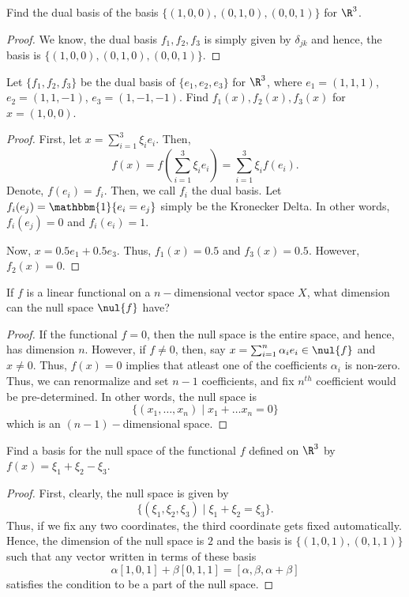 \begin{question}
    Find the dual basis of the basis $\{(1,0,0) , (0,1,0) , (0,0,1)\}$ for $\R^3$.
    \label{section2.9-3}
\end{question}
\begin{proof}
    We know, the dual basis $f_1,f_2,f_3$ is simply given by $\delta_{jk}$ and hence, the basis is $\{(1,0,0) , (0,1,0) , (0,0,1)\}$.
\end{proof}

\begin{question}
    Let $\{f_1 , f_2 , f_3\}$ be the dual basis of $\{e_1 , e_2 , e_3\}$ for $\R^3$, where $e_1 = (1,1,1)$, $e_2 = (1,1,-1)$, $e_3 = (1,-1,-1)$. Find $f_1(x) , f_2(x) , f_3(x)$ for $x = (1,0,0)$.
    \label{section2.9-4}
\end{question}
\begin{proof}
    First, let $x = \sum_{i=1}^3 \xi_i e_i$. Then, 
    \[f(x) = f\left(\sum_{i=1}^3 \xi_i e_i\right) = \sum_{i=1}^3 \xi_i f(e_i).\]
    Denote, $f(e_i) = f_i$. Then, we call $f_i$ the dual basis. Let $f_i(e_j) = \mathbbm{1}\{e_i = e_j\}$ simply be the Kronecker Delta. In other words, $f_i(e_j) = 0$ and $f_i(e_i) = 1$.
    
    Now, $x = 0.5 e_1 + 0.5 e_3$. Thus, $f_1(x) = 0.5 $ and $f_3(x) = 0.5$. However, $f_2(x) = 0$.
\end{proof}

\begin{question}
    If $f$ is a linear functional on a $n-$dimensional vector space $X$, what dimension can the null space $\nul{f}$ have?
    \label{section2.9-5}
\end{question}
\begin{proof}
    If the functional $f = 0$, then the null space is the entire space, and hence, has dimension $n$. However, if $f \neq 0$, then, say $x = \sum_{i=1}^n \alpha_i e_i \in \nul{f}$ and $x \neq 0$. Thus, $f(x) = 0$ implies that atleast one of the coefficients $\alpha_i$ is non-zero. Thus, we can renormalize and set $n-1$ coefficients, and fix $n^{th}$ coefficient would be pre-determined. In other words, the null space is 
    \[\{(x_1 , \ldots , x_n) \mid x_1 + \ldots x_n = 0\}\]
    which is an $(n-1)-$dimensional space.
\end{proof}

\begin{question}
    Find a basis for the null space of the functional $f$ defined on $\R^3$ by $f(x) = \xi_1 + \xi_2 - \xi_3$.
    \label{section2.9-6}
\end{question}
\begin{proof}
    First, clearly, the null space is given by
    \[\{(\xi_1 , \xi_2 , \xi_3) \mid \xi_1 + \xi_2 = \xi_3\}.\]
    Thus, if we fix any two coordinates, the third coordinate gets fixed automatically. Hence, the dimension of the null space is $2$ and the basis is $\{(1,0,1) , (0,1,1)\}$ such that any vector written in terms of these basis
    \[\alpha [1,0,1] + \beta [0,1,1] = [\alpha , \beta , \alpha + \beta]\]
    satisfies the condition to be a part of the null space.
\end{proof}

